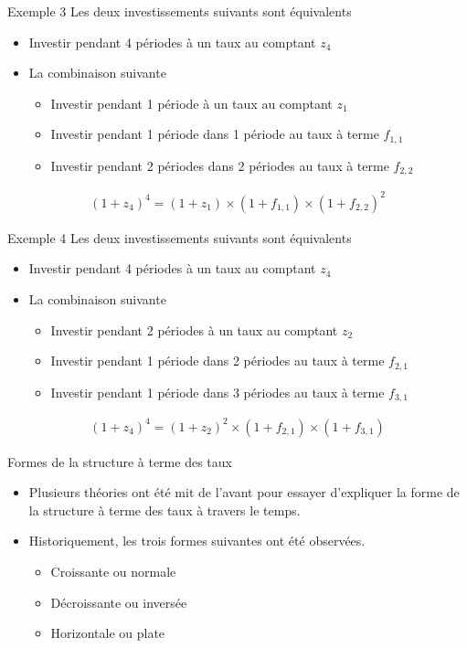 \documentclass[11pt]{beamer}
\begin{document}
\begin{frame}{Exemple 3}
Les deux investissements suivants sont équivalents
\begin{itemize}
\item Investir pendant 4 périodes à un taux au comptant $z_4$
\item La combinaison suivante
\begin{itemize}
\item Investir pendant 1 période à un taux au comptant $z_1$
\item Investir pendant 1 période dans 1 période au taux à terme $f_{1,1}$
\item Investir pendant 2 périodes dans 2 périodes au taux à terme $f_{2,2}$
\end{itemize}
\end{itemize}
\begin{align*}
(1+z_4)^4=(1+z_1) \times (1+f_{1,1}) \times (1+f_{2,2})^2
\end{align*}
\end{frame}

\begin{frame}{Exemple 4}
Les deux investissements suivants sont équivalents
\begin{itemize}
\item Investir pendant 4 périodes à un taux au comptant $z_4$
\item La combinaison suivante
\begin{itemize}
\item Investir pendant 2 périodes à un taux au comptant $z_2$
\item Investir pendant 1 période dans 2 périodes au taux à terme $f_{2,1}$
\item Investir pendant 1 période dans 3 périodes au taux à terme $f_{3,1}$
\end{itemize}
\end{itemize}
\begin{align*}
(1+z_4)^4=(1+z_2)^2 \times (1+f_{2,1}) \times (1+f_{3,1})
\end{align*}
\end{frame}


\begin{frame}{Formes de la structure à terme des taux}
\begin{itemize}
\item Plusieurs théories ont été mit de l'avant pour essayer d'expliquer la forme de la structure à terme des taux à travers le temps. 
\item Historiquement,  les trois formes suivantes ont été observées.
\begin{itemize}
\item Croissante ou normale
\item Décroissante ou inversée
\item Horizontale ou plate
\end{itemize}
\end{itemize}
\end{frame}
\end{document}

